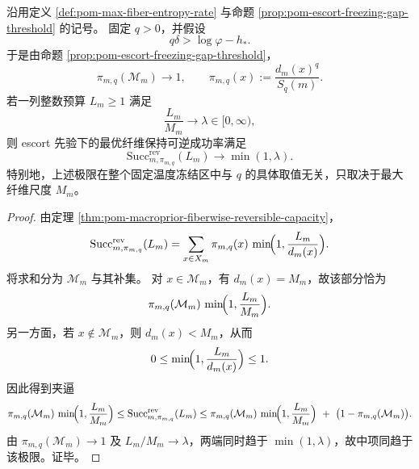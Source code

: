 \begin{theorem}[固定温度冻结区中的普适可逆阈值只由最大纤维尺度决定]\label{thm:pom-fixedq-frozen-universal-reversible-threshold}
沿用定义 \ref{def:pom-max-fiber-entropy-rate} 与命题 \ref{prop:pom-escort-freezing-gap-threshold} 的记号。
固定 \(q>0\)，并假设
\[
q\delta>\log\varphi-h_\ast.
\]
于是由命题 \ref{prop:pom-escort-freezing-gap-threshold}，
\[
\pi_{m,q}(\mathcal M_m)\longrightarrow 1,
\qquad
\pi_{m,q}(x):=\frac{d_m(x)^q}{S_q(m)}.
\]
若一列整数预算 \(L_m\ge 1\) 满足
\[
\frac{L_m}{M_m}\longrightarrow \lambda\in[0,\infty),
\]
则 escort 先验下的最优纤维保持可逆成功率满足
\[
\boxed{\;
\mathrm{Succ}^{\mathrm{rev}}_{m,\pi_{m,q}}(L_m)
\longrightarrow
\min(1,\lambda).
\;}
\]
特别地，上述极限在整个固定温度冻结区中与 \(q\) 的具体取值无关，只取决于最大纤维尺度 \(M_m\)。
\end{theorem}
\begin{proof}
由定理 \ref{thm:pom-macroprior-fiberwise-reversible-capacity}，
\[
\mathrm{Succ}^{\mathrm{rev}}_{m,\pi_{m,q}}(L_m)
=
\sum_{x\in X_m}\pi_{m,q}(x)\,
\min\!\Bigl(1,\frac{L_m}{d_m(x)}\Bigr).
\]
将求和分为 \(\mathcal M_m\) 与其补集。
对 \(x\in\mathcal M_m\)，有 \(d_m(x)=M_m\)，故该部分恰为
\[
\pi_{m,q}(\mathcal M_m)\,
\min\!\Bigl(1,\frac{L_m}{M_m}\Bigr).
\]
另一方面，若 \(x\notin\mathcal M_m\)，则 \(d_m(x)<M_m\)，从而
\[
0\le
\min\!\Bigl(1,\frac{L_m}{d_m(x)}\Bigr)
\le 1.
\]
因此得到夹逼
\[
\pi_{m,q}(\mathcal M_m)\,
\min\!\Bigl(1,\frac{L_m}{M_m}\Bigr)
\le
\mathrm{Succ}^{\mathrm{rev}}_{m,\pi_{m,q}}(L_m)
\le
\pi_{m,q}(\mathcal M_m)\,
\min\!\Bigl(1,\frac{L_m}{M_m}\Bigr)
\ +\ \bigl(1-\pi_{m,q}(\mathcal M_m)\bigr).
\]
由 \(\pi_{m,q}(\mathcal M_m)\to 1\) 及 \(L_m/M_m\to \lambda\)，两端同时趋于 \(\min(1,\lambda)\)，故中项同趋于该极限。证毕。
\end{proof}

